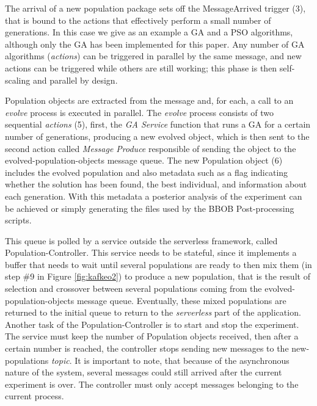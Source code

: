 \documentclass{llncs}
\begin{document}
  The arrival of a new population
  package sets off the {\sf MessageArrived} trigger (3), that is bound to
  the actions that effectively perform a small number of generations. In this case we give as an example a GA and a PSO algorithms, 
  although only the GA has been implemented 
  for this paper. Any number of GA algorithms ({\em actions}) can be triggered in parallel by the same message, and new actions can be triggered while others are still working; this phase is
  then self-scaling and parallel by design.

  Population objects are extracted from the message and, for each, a call to
  an {\em evolve} process is executed in parallel. The {\em evolve} process
  consists of two sequential {\em actions} (5), first, the {\em GA Service} function that
  runs a GA for a certain number of generations, producing a new evolved
  object, which is then sent to the second action called {\em Message Produce}
   responsible of sending the object to the {\sf evolved-population-objects} 
   message queue.  The new Population object (6) includes
   the evolved population and also metadata such as a flag indicating
  whether the solution has been found, the best individual, and information
  about each generation. With this metadata a posterior analysis of the experiment
  can be achieved or simply generating the files used by the BBOB Post-processing scripts.

  This queue is polled by a service outside the serverless framework, called
  {\sf Population-Controller}. This service needs to be stateful, since it implements a buffer that needs to wait until several populations are ready to then mix them (in step \#9 in Figure \ref{fig:kafkeo2}) to produce a new population, that is the result of selection
  and crossover between several populations coming from the {\sf
    evolved-population-objects} message queue. Eventually, these mixed
  populations are returned to the initial queue to return to the {\em
    serverless} part of the application. Another task of the 
    {\sf Population-Controller} is to start and stop the experiment. The service must
    keep the number of Population objects received, then after
    a certain number is reached, the controller stops sending new messages to the
    {\sf new-populations} {\em topic}. It is important to note, that because of
    the asynchronous nature of the system, several messages could still
    arrived after the current experiment is over. The controller must only
    accept messages belonging to the current process.
\end{document}
